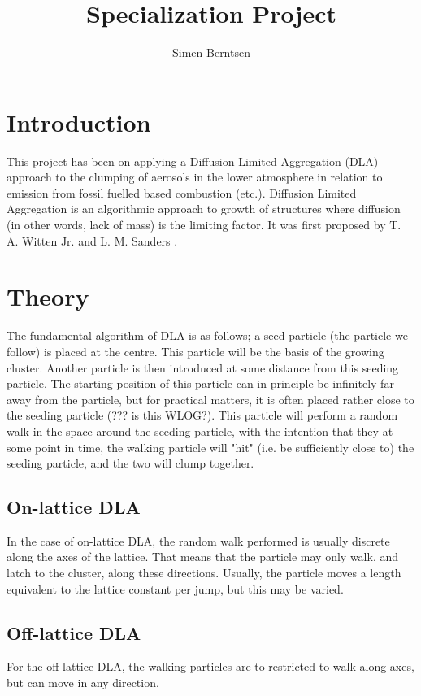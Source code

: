 \documentclass{article}
\title{Specialization Project}
\author{Simen Berntsen}
\begin{document}
\maketitle



\section{Introduction}
This project has been on applying a Diffusion Limited Aggregation (DLA) approach to the clumping of aerosols in the lower atmosphere in relation to emission from fossil fuelled based combustion (etc.). Diffusion Limited Aggregation is an algorithmic approach to growth of structures where diffusion (in other words, lack of mass) is the limiting factor. It was first proposed by T. A. Witten Jr. and L. M. Sanders \cite{witten_and_sanders81}. 

\section{Theory}

The fundamental algorithm of DLA is as follows; a seed particle (the particle we follow) is placed at the centre. This particle will be the basis of the growing cluster. Another particle is then introduced at some distance from this seeding particle. The starting position of this particle can in principle be infinitely far away from the particle, but for practical matters, it is often placed rather close to the seeding particle (??? is this WLOG?). This particle will perform a random walk in the space around the seeding particle, with the intention that they at some point in time, the walking particle will "hit" (i.e. be sufficiently close to) the seeding particle, and the two will clump together. 

\subsection{On-lattice DLA}
In the case of on-lattice DLA, the random walk performed is usually discrete along the axes of the lattice. That means that the particle may only walk, and latch to the cluster, along these directions. Usually, the particle moves a length equivalent to the lattice constant per jump, but this may be varied. 

\subsection{Off-lattice DLA}
For the off-lattice DLA, the walking particles are to restricted to walk along axes, but can move in any direction. 
\end{document}
